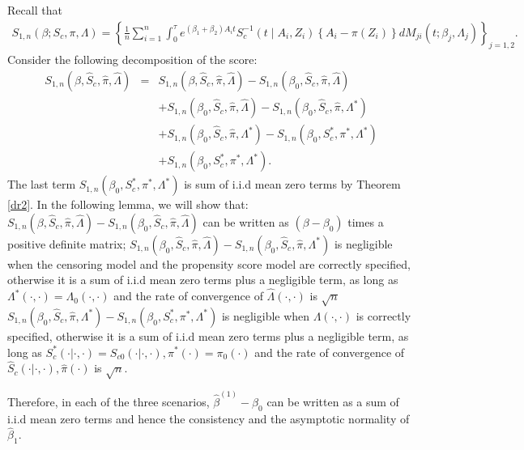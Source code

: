 \documentclass[11pt]{article}
\newcommand{\eqnn}{\begin{eqnarray*}}
\newcommand{\een}{\end{eqnarray*}}
\begin{document}
Recall that %
\eqnn
{S}_{1,n}(\beta; S_c,  \pi,  \Lambda)=\left\{\frac{1}{n}\sum_{i=1}^n\int_0^\tau e^{ (\beta_1  + \beta_2) A_i t} S^{-1}_c(t \mid A_i,Z_i)\left\{A_i -\pi( Z_i)\right\}dM_{ji}(t ; \beta_j, \Lambda_{j})\right\}_{j=1,2}.
\een
Consider the following decomposition of the score:
\eqnn
{S}_{1,n}({\beta}, \hat S_c,  \hat \pi, \hat \Lambda)
&=&  {S}_{1,n}({\beta}, \hat S_c,  \hat \pi,  \hat \Lambda)-{S}_{1,n}({\beta}_0, \hat S_c,  \hat \pi,  \hat \Lambda)\\
&&+{S}_{1,n}({\beta}_0, \hat S_c,  \hat \pi,  \hat \Lambda)-{S}_{1,n}({\beta}_0, \hat S_c,  \hat \pi,  \Lambda^{*})\\
&&+ {S}_{1,n}({\beta}_0, \hat S_c,  \hat \pi, \Lambda^{*})-{S}_{1,n}({\beta}_0, S^{*}_c,  \pi^{*}, \Lambda^{*})\\
&&+ {S}_{1,n}({\beta}_0, S^{*}_c,  \pi^{*}, \Lambda^{*}).
\een
The last term ${S}_{1,n}({\beta}_0, S^{*}_c,  \pi^{*}, \Lambda^{*})$ is sum of i.i.d mean zero terms by Theorem \ref{dr2}. 
In the following lemma, we will show that: 
${S}_{1,n}({\beta}, \hat S_c,  \hat \pi,  \hat \Lambda)-{S}_{1,n}({\beta}_0, \hat S_c,  \hat \pi,  \hat \Lambda)$ can be written as $(\beta-\beta_0)$ times a positive definite matrix;
${S}_{1,n}({\beta}_0, \hat S_c,  \hat \pi,  \hat \Lambda)-{S}_{1,n}({\beta}_0, \hat S_c,  \hat \pi,  \Lambda^{*})$ is negligible when the censoring model and the propensity score model are correctly specified, otherwise it is a sum of i.i.d mean zero terms plus a negligible term, as long as $\Lambda^{*}(\cdot,\cdot)=\Lambda_0(\cdot,\cdot)$ and the rate of convergence of $\hat \Lambda(\cdot,\cdot)$ is $\sqrt{n}$
${S}_{1,n}({\beta}_0, \hat S_c,  \hat \pi, \Lambda^{*})-{S}_{1,n}({\beta}_0, S^{*}_c,  \pi^{*}, \Lambda^{*})$ is negligible when $\Lambda(\cdot,\cdot)$ is correctly specified, otherwise it is a sum of i.i.d mean zero terms plus a negligible term, as long as $S_c^{*}(\cdot | \cdot,\cdot)=S_{c0}(\cdot | \cdot,\cdot), \pi^{*}(\cdot)=\pi_0(\cdot)$ and the rate of convergence of $\hat S_c(\cdot | \cdot,\cdot),\hat \pi(\cdot)$ is $\sqrt{n}$.

Therefore, in each of the three scenarios,
$\hat \beta^{(1)}-\beta_0$ can be written as a sum of i.i.d mean zero terms and hence the consistency and the asymptotic normality of $\hat \beta_1$.
\end{document}
